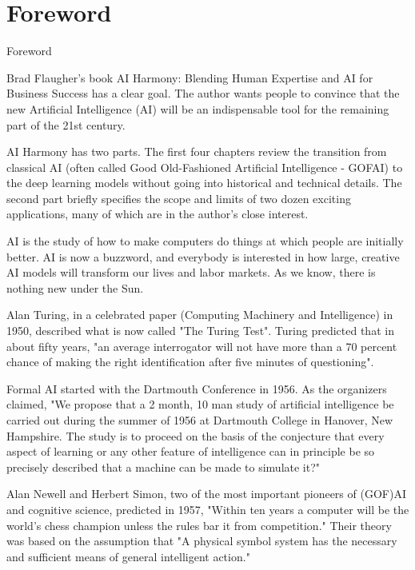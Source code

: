 \let\cleardoublepage\clearpage
\chapter*{Foreword}

					Foreword


 	Brad Flaugher's book AI Harmony: Blending Human Expertise and AI for Business Success has a clear goal. The author wants people to convince that the new Artificial Intelligence (AI) will be an indispensable tool for the remaining part of the 21st century.

	AI Harmony has two parts. The first four chapters review the transition from classical AI (often called Good Old-Fashioned Artificial Intelligence - GOFAI) to the deep learning models without going into historical and technical details. The second part briefly specifies the scope and limits of two dozen exciting applications, many of which are in the author's close interest.

	AI is the study of how to make computers do things at which people are initially better. AI is now a buzzword, and everybody is interested in how large, creative AI models will transform our lives and labor markets. As we know, there is nothing new under the Sun.

	Alan Turing, in a celebrated paper (Computing Machinery and Intelligence) in 1950, described what is now called "The Turing Test". Turing predicted that in about fifty years, "an average interrogator will not have more than a 70 percent chance of making the right identification after five minutes of questioning".

	Formal AI started with the Dartmouth Conference in 1956. As the organizers claimed, "We propose that a 2 month, 10 man study of artificial intelligence be carried out during the summer of 1956 at Dartmouth College in Hanover, New Hampshire. The study is to proceed on the basis of the
conjecture that every aspect of learning or any other feature of intelligence can in principle be so precisely described that a machine can be made to simulate it?"

	Alan Newell and Herbert Simon, two of the most important pioneers of (GOF)AI and cognitive science, predicted in 1957, "Within ten years a computer will be the world's chess champion unless the rules bar it from competition." Their theory was based on the assumption that "A physical symbol system has the necessary and sufficient means of general intelligent action."


